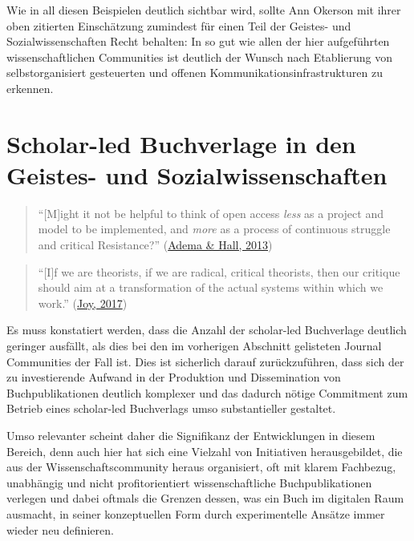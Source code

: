 \documentclass[a4paper,
fontsize=11pt,
oneside,
numbers=noperiodatend,
parskip=half-,
bibliography=totoc,
final
]{scrartcl}
\begin{document}
Wie in all diesen Beispielen deutlich sichtbar wird, sollte Ann Okerson
mit ihrer oben zitierten Einschätzung zumindest für einen Teil der
Geistes- und Sozialwissenschaften Recht behalten: In so gut wie allen
der hier aufgeführten wissenschaftlichen Communities ist deutlich der
Wunsch nach Etablierung von selbstorganisiert gesteuerten und offenen
Kommunikationsinfrastrukturen zu erkennen.

\hypertarget{scholar-led-buchverlage-in-den-geistes--und-sozialwissenschaften}{%
\section{Scholar-led Buchverlage in den Geistes- und
Sozialwissenschaften}\label{scholar-led-buchverlage-in-den-geistes--und-sozialwissenschaften}}

\begin{quote}
\enquote{{[}M{]}ight it not be helpful to think of open access
\emph{less} as a project and model to be implemented, and \emph{more} as
a process of continuous struggle and critical Resistance?}
(\href{https://doi.org/10.3898/NewF.78.07.2013}{Adema \& Hall, 2013})
\end{quote}

\begin{quote}
\enquote{{[}I{]}f we are theorists, if we are radical, critical
theorists, then our critique should aim at a transformation of the
actual systems within which we work.}
(\href{https://repository.jisc.ac.uk/6652/}{Joy, 2017})
\end{quote}

Es muss konstatiert werden, dass die Anzahl der scholar-led Buchverlage
deutlich geringer ausfällt, als dies bei den im vorherigen Abschnitt
gelisteten Journal Communities der Fall ist. Dies ist sicherlich darauf
zurückzuführen, dass sich der zu investierende Aufwand in der Produktion
und Dissemination von Buchpublikationen deutlich komplexer und das
dadurch nötige Commitment zum Betrieb eines scholar-led Buchverlags umso
substantieller gestaltet.

Umso relevanter scheint daher die Signifikanz der Entwicklungen in
diesem Bereich, denn auch hier hat sich eine Vielzahl von Initiativen
herausgebildet, die aus der Wissenschaftscommunity heraus organisiert,
oft mit klarem Fachbezug, unabhängig und nicht profitorientiert
wissenschaftliche Buchpublikationen verlegen und dabei oftmals die
Grenzen dessen, was ein Buch im digitalen Raum ausmacht, in seiner
konzeptuellen Form durch experimentelle Ansätze immer wieder neu
definieren.
\end{document}
